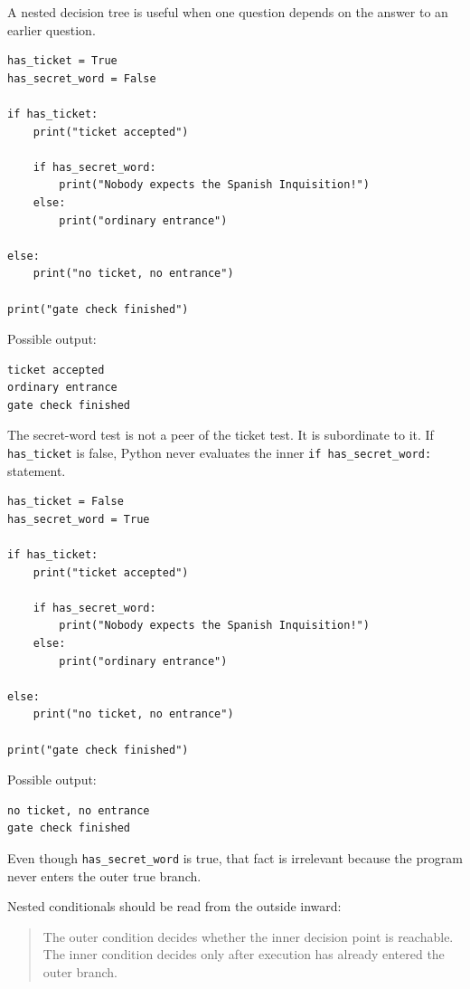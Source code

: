 A nested decision tree is useful when one question depends on the answer to an earlier question.

\begin{verbatim}
has_ticket = True
has_secret_word = False

if has_ticket:
    print("ticket accepted")

    if has_secret_word:
        print("Nobody expects the Spanish Inquisition!")
    else:
        print("ordinary entrance")

else:
    print("no ticket, no entrance")

print("gate check finished")
\end{verbatim}

Possible output:

\begin{verbatim}
ticket accepted
ordinary entrance
gate check finished
\end{verbatim}

The secret-word test is not a peer of the ticket test. It is subordinate to it. If \texttt{has\_ticket} is false, Python never evaluates the inner \texttt{if has\_secret\_word:} statement.

\begin{verbatim}
has_ticket = False
has_secret_word = True

if has_ticket:
    print("ticket accepted")

    if has_secret_word:
        print("Nobody expects the Spanish Inquisition!")
    else:
        print("ordinary entrance")

else:
    print("no ticket, no entrance")

print("gate check finished")
\end{verbatim}

Possible output:

\begin{verbatim}
no ticket, no entrance
gate check finished
\end{verbatim}

Even though \texttt{has\_secret\_word} is true, that fact is irrelevant because the program never enters the outer true branch.

Nested conditionals should be read from the outside inward:

\begin{quote}
The outer condition decides whether the inner decision point is reachable. The inner condition decides only after execution has already entered the outer branch.
\end{quote}

